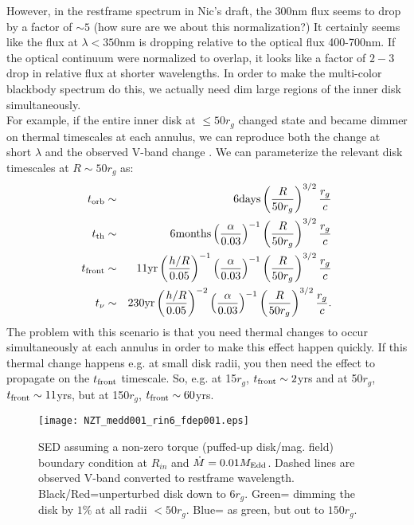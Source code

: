 \documentclass[12pt]{article}
\begin{document}
However, in the restframe spectrum in Nic's draft, the 300nm flux seems to drop by a factor of $\sim 5$ (how sure are we about this normalization?) It certainly seems like the flux at $\lambda<350$nm is dropping relative to the optical flux 400-700nm. If the optical continuum were normalized to overlap, it looks like a factor of $2-3$ drop in relative flux at shorter wavelengths. In order to make the multi-color blackbody spectrum do this, we actually need dim large regions of the inner disk simultaneously.\\

For example, if the entire inner disk at $\leq 50 r_{g}$ changed state and became dimmer on thermal timescales at each annulus, we can reproduce both the change at short $\lambda$ and the observed V-band change . We can parameterize the relevant disk timescales at $R\sim 50r_{g}$ as:
\begin{eqnarray}
t_{\rm orb} & \sim & 6{\rm days} \left(\frac{R}{50r_{g}}\right)^{3/2} \frac{r_{g}}{c}\\
t_{\rm th} & \sim & 6{\rm months} \left(\frac{\alpha}{0.03}\right)^{-1}\left(\frac{R}{50r_{g}}\right)^{3/2} \frac{r_{g}}{c}\\
t_{\rm front} & \sim & 11{\rm yr} \left(\frac{h/R}{0.05}\right)^{-1}\left(\frac{\alpha}{0.03}\right)^{-1}\left(\frac{R}{50r_{g}}\right)^{3/2} \frac{r_{g}}{c}\\
t_{\nu} & \sim & 230{\rm yr} \left(\frac{h/R}{0.05}\right)^{-2}\left(\frac{\alpha}{0.03}\right)^{-1}\left(\frac{R}{50r_{g}}\right)^{3/2} \frac{r_{g}}{c}.
\end{eqnarray}
The problem with this scenario is that you need thermal changes to occur simultaneously at each annulus in order to make this effect happen quickly. If this thermal change happens e.g. at small disk radii, you then need the effect to propagate on the $t_{\rm front}$ timescale. So, e.g. at 15$r_{g}$, $t_{\rm front} \sim 2$yrs and at 50$r_{g}$, $t_{\rm front} \sim 11$yrs, but at 150$r_{g}$, $t_{\rm front} \sim 60$yrs.\\

\begin{figure}
\begin{center}
\texttt{[image: NZT\_medd001\_rin6\_fdep001.eps]}
\end{center}
\caption[cartoon]{
SED assuming a non-zero torque (puffed-up disk/mag. field) boundary condition at $R_{in}$ and $\dot{M}=0.01M_{\rm Edd}$. Dashed lines are observed V-band converted to restframe wavelength. Black/Red=unperturbed disk down to 6$r_{g}$. Green= dimming the disk by $1\%$ at all radii $<50r_{g}$. Blue= as green, but out to $150r_{g}$.
\label{fig:nzt_dim}}
\end{figure}
\end{document}
